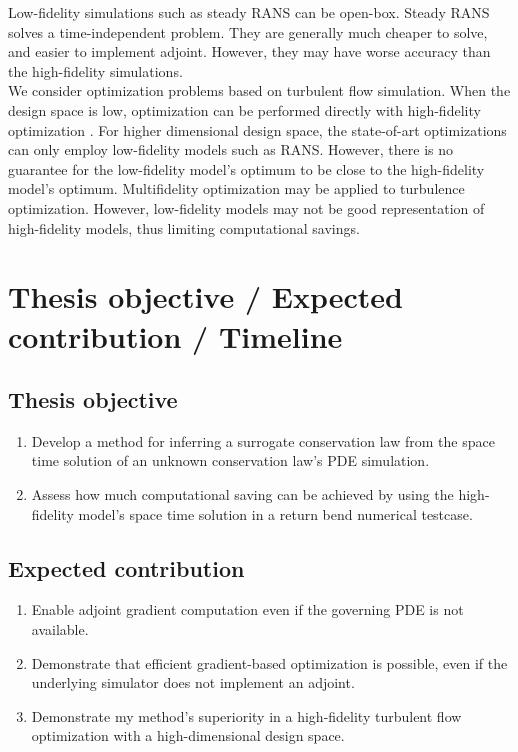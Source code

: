 \documentclass[a4paper,onecolumn]{article}
\theoremstyle{remark}
\begin{document}
\noindent Low-fidelity simulations such as steady RANS can be open-box. 
Steady RANS solves a time-independent problem.
They are generally much cheaper to solve, and easier to implement adjoint. However,
they may have worse accuracy than the high-fidelity simulations.\\

\noindent We consider optimization problems based on turbulent flow simulation. 
When the design space is low, optimization can be performed directly with high-fidelity optimization
\cite{Chai opt}. For higher dimensional design space, the state-of-art optimizations can
only employ low-fidelity models such as RANS. However, there is no guarantee for
the low-fidelity model's optimum to be close to the high-fidelity model's optimum.
Multifidelity optimization may be applied to turbulence optimization. 
However, low-fidelity models may not be good representation of high-fidelity models, thus limiting computational savings. \\


\newpage
\section{Thesis objective / Expected contribution / Timeline}

\subsection{Thesis objective}
\begin{enumerate}
    \item Develop a method for inferring a surrogate conservation law 
    from the space time solution of an unknown conservation law's PDE simulation.
    \item Assess how much computational saving can be achieved by using the high-fidelity model's space time solution in  a return bend numerical testcase.
\end{enumerate}

\subsection{Expected contribution}
\begin{enumerate}
    \item Enable adjoint gradient computation even if the governing PDE is not available.
    \item Demonstrate that efficient gradient-based optimization is possible, even if the underlying simulator does not implement
          an adjoint.
    \item Demonstrate my method's superiority in a high-fidelity turbulent flow optimization with a
    high-dimensional design space.
\end{enumerate}
\end{document}
